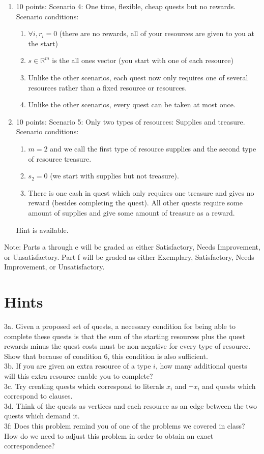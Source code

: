 \documentclass[12pt]{article}
\begin{document}
\begin{enumerate}
\begin{enumerate}
\item[3.] $\forall j, |\{i:(c_i)_j \geq 1\}| \leq 2$ (for any resource, there are at most two quests which require it).
\end{enumerate}
Hint is available.
\item[(e)] 10 points: Scenario 4: One time, flexible, cheap quests but no rewards. Scenario conditions:
\begin{enumerate}
\item[1.] $\forall i, r_i = 0$ (there are no rewards, all of your resources are given to you at the start)
\item[2.] $s \in \mathbb{R}^m$ is the all ones vector (you start with one of each resource)
\item[3.] Unlike the other scenarios, each quest now only requires one of several resources rather than a fixed resource or resources.
\item[4.] Unlike the other scenarios, every quest can be taken at most once.
\end{enumerate}
\item[(f)] 10 points: Scenario 5: Only two types of resources: Supplies and treasure. Scenario conditions:
\begin{enumerate}
\item[1.] $m = 2$ and we call the first type of resource supplies and the second type of resource treasure.
\item[2.] $s_2 = 0$ (we start with supplies but not treasure).
\item[3.] There is one cash in quest which only requires one treasure and gives no reward (besides completing the quest). All other quests require some amount of supplies and give some amount of treasure as a reward.
\end{enumerate}
Hint is available.
\end{enumerate}
Note: Parts a through e will be graded as either Satisfactory, Needs Improvement, or Unsatisfactory. Part f will be graded as either Exemplary, Satisfactory, Needs Improvement, or Unsatisfactory.
\newpage
\section*{Hints}
3a. Given a proposed set of quests, a necessary condition for being able to complete these quests is that the sum of the starting resources plus the quest rewards minus the quest costs must be non-negative for every type of resource. Show that because of condition 6, this condition is also sufficient.\\
3b. If you are given an extra resource of a type $i$, how many additional quests will this extra resource enable you to complete?\\
3c. Try creating quests which correspond to literals $x_i$ and $\neg{x}_i$ and quests which correspond to clauses.\\
3d. Think of the quests as vertices and each resource as an edge between the two quests which demand it.\\
3f: Does this problem remind you of one of the problems we covered in class? How do we need to adjust this problem in order to obtain an exact correspondence?
\end{document}

